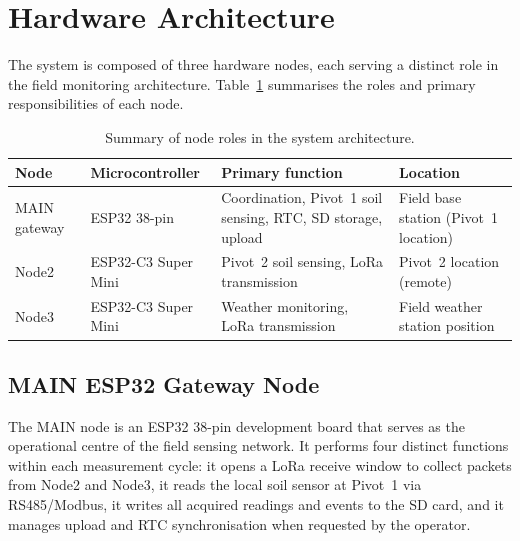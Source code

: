 \section{Hardware Architecture}
\label{sec:hardware}

The system is composed of three hardware nodes, each serving a distinct role in the field monitoring architecture. Table~\ref{tab:node-roles} summarises the roles and primary responsibilities of each node.

\begin{table}[H]
\centering
\caption{Summary of node roles in the system architecture.}
\label{tab:node-roles}
\small
\begin{tabular}{p{2.5cm} p{3.0cm} p{4.0cm} p{4.5cm}}
\hline
\textbf{Node} & \textbf{Microcontroller} & \textbf{Primary function} & \textbf{Location} \\
\hline
MAIN gateway & ESP32 38-pin & Coordination, Pivot~1 soil sensing, RTC, SD storage, upload & Field base station (Pivot~1 location) \\
\hline
Node2 & ESP32-C3 Super Mini & Pivot~2 soil sensing, LoRa transmission & Pivot~2 location (remote) \\
\hline
Node3 & ESP32-C3 Super Mini & Weather monitoring, LoRa transmission & Field weather station position \\
\hline
\end{tabular}
\end{table}

\subsection{MAIN ESP32 Gateway Node}
\label{sec:main-node}

The MAIN node is an ESP32 38-pin development board that serves as the operational centre of the field sensing network. It performs four distinct functions within each measurement cycle: it opens a LoRa receive window to collect packets from Node2 and Node3, it reads the local soil sensor at Pivot~1 via RS485/Modbus, it writes all acquired readings and events to the SD card, and it manages upload and RTC synchronisation when requested by the operator.


